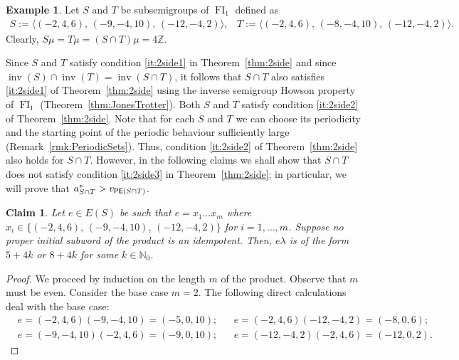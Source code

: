 \documentclass[reqno]{amsart}
\theoremstyle{plain}
\newtheorem{claim}{Claim}[lem]
\theoremstyle{definition}
\newtheorem{ex}[lem]{Example}
\DeclareMathOperator{\inv}{inv}
\DeclareMathOperator{\FI}{FI}
\DeclareMathOperator{\PE}{\textup{\textsf{PE}}}
\numberwithin{equation}{section}
\begin{document}
\begin{ex}
\label{ex:2sideIntersect}
Let $S$ and $T$ be subsemigroups of $\FI_1$ defined as
\begin{align*}
    S := \langle (-2, 4, 6),\, (-9, -4, 10),\, (-12, -4, 2)\rangle,\;\;\; T := \langle (-2, 4, 6),\, (-8, -4, 10),\, (-12, -4, 2)\rangle.
\end{align*}
Clearly, $S\mu = T\mu = (S\cap T)\mu = 4\mathbb{Z}$. 

Since $S$ and $T$ satisfy condition \ref{it:2side1} in Theorem~\ref{thm:2side} and since $\inv(S)\cap \inv(T) = \inv(S\cap T)$, it follows that $S\cap T$ also satisfies \ref{it:2side1} of Theorem~\ref{thm:2side} using the inverse semigroup Howson property of $\FI_1$ (Theorem~\ref{thm:JonesTrotter}). Both $S$ and $T$ satisfy condition \ref{it:2side2} of Theorem~\ref{thm:2side}. Note that for each $S$ and $T$ we can choose its periodicity and the starting point of the periodic behaviour sufficiently large (Remark~\ref{rmk:PeriodicSets}). Thus, condition \ref{it:2side2} of Theorem~\ref{thm:2side} also holds for $S\cap T$. However, in the following claims we shall show that $S\cap T$ does not satisfy condition \ref{it:2side3} in Theorem~\ref{thm:2side}; in particular, we will prove that $a_{S\cap T}^\ast > v_{\PE(S\cap T)}$.

\begin{claim}
\label{cl:2sideIntersect1}
Let $e\in E(S)$ be such that $e = x_1\dots x_m$ where $x_i\in\{(-2, 4, 6),\, (-9, -4, 10),\, (-12, -4, 2)\}$ for $i=1, \dots, m$. Suppose no proper initial subword of the product is an idempotent. Then, $e\lambda$ is of the form $5+4k$ or $8+4k$ for some $k\in\mathbb{N}_0$.
\end{claim}
\begin{proof}
We proceed by induction on the length $m$ of the product. Observe that $m$ must be even. Consider the base case $m=2$. The following direct calculations deal with the base case: 
\begin{align*}
    &e = (-2, 4, 6)(-9, -4, 10) = (-5, 0, 10); && e=(-2,4,6)(-12,-4,2) = (-8, 0, 6);\\
    &e= (-9, -4, 10)(-2, 4, 6) = (-9, 0, 10); &&e=(-12,-4,2)(-2,4,6) = (-12,0,2).
\end{align*}


\end{proof}
\end{ex}
\end{document}
